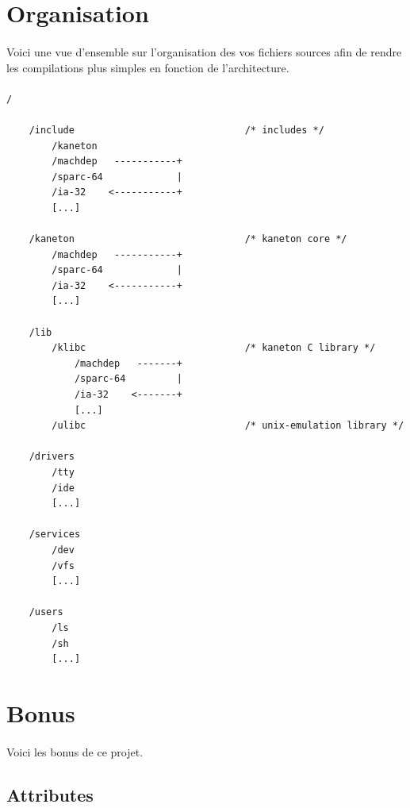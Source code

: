 \documentclass[10pt,a4wide]{article}
\begin{document}
\section{Organisation}

\paragraph{}

Voici une vue d'ensemble sur l'organisation des vos fichiers sources
afin de rendre les compilations plus simples en fonction de l'architecture.

\paragraph{}

\begin{verbatim}
/

    /include                              /* includes */
        /kaneton
        /machdep   -----------+
        /sparc-64             |
        /ia-32    <-----------+
        [...]

    /kaneton                              /* kaneton core */
        /machdep   -----------+
        /sparc-64             |
        /ia-32    <-----------+
        [...]

    /lib
        /klibc                            /* kaneton C library */
            /machdep   -------+
            /sparc-64         |
            /ia-32    <-------+
            [...]
        /ulibc                            /* unix-emulation library */

    /drivers
        /tty
        /ide
        [...]

    /services
        /dev
        /vfs
        [...]

    /users
        /ls
        /sh
        [...]
\end{verbatim}

\section{Bonus}

\paragraph{}

Voici les bonus de ce projet.

\subsection{Attributes}
\end{document}
